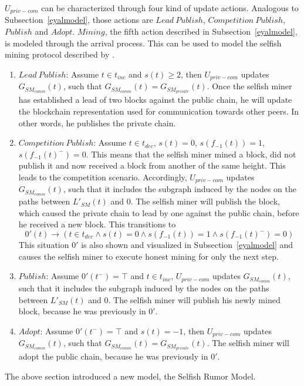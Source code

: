 $U_{priv-com}$ can be characterized through four kind of update actions. Analogous to Subsection~\ref{eyalmodel}, those actions are $Lead~Publish$, $Competition~Publish$, $Publish$ and $Adopt$. $Mining$, the fifth action described in Subsection~\ref{eyalmodel}, is modeled through the arrival process.
This can be used to model the selfish mining protocol described by \citeauthor{eyal}.
\begin{enumerate}
\item $Lead~Publish$: Assume $t \in t_{inc}$ and $s(t) \geq 2$, then $U_{priv-com}$ updates $G_{SM_{comm}}(t)$, such that $G_{SM_{comm}}(t) = G_{SM_{private}}(t)$. Once the selfish miner has established a lead of two blocks against the public chain, he will update the blockchain representation used for communication towards other peers. In other words, he publishes the private chain.
\item $Competition~Publish$: Assume $t \in t_{dec}$, $s(t) = 0$, $s(f_{-1}(t)) = 1$, $s(f_{-1}(t)^-) = 0$. This means that the selfish miner mined a block, did not publish it and now received a block from another of the same height. This leads to the competition scenario. Accordingly, $U_{priv-com}$ updates $G_{SM_{comm}}(t)$, such that it includes the subgraph induced by the nodes on the paths between $L'_{SM}(t)$ and ${0}$. The selfish miner will publish the block, which caused the private chain to lead by one against the public chain, before he received a new block. This transitions to 
\begin{equation}
0'(t) \rightarrow \left( t \in t_{dec} \wedge s(t) = 0 \wedge s(f_{-1}(t)) = 1 \wedge s(f_{-1}(t)^-) = 0\right)
\end{equation}
This situation $0'$ is also shown and visualized in Subsection~\ref{eyalmodel} and causes the selfish miner to execute honest mining for only the next step. \label{comppub}
\item $Publish$: Assume $0'(t^-)=\top$ and $t \in t_{inc}$, $U_{priv-com}$ updates $G_{SM_{comm}}(t)$, such that it includes the subgraph induced by the nodes on the paths between $L'_{SM}(t)$ and ${0}$. The selfish miner will publish his newly mined block, because he was previously in $0'$.
\item $Adopt$: Assume $0'(t^-)=\top$ and $s(t)=-1$, then $U_{priv-com}$ updates $G_{SM_{comm}}(t)$, such that $G_{SM_{comm}}(t) = G_{SM_{private}}(t)$. The selfish miner will adopt the public chain, because he was previously in $0'$.
\end{enumerate}
The above section introduced a new model, the Selfish Rumor Model.
